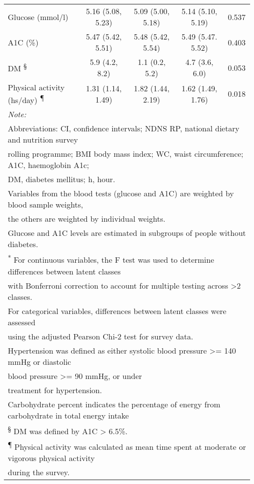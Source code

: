 \begin{table}
\begin{tabular}[t]{lcccc}
		Glucose (mmol/l) & 5.16 (5.08, 5.23) & 5.09 (5.00, 5.18) & 5.14 (5.10, 5.19) & 0.537\\
		A1C (\%) & 5.47 (5.42, 5.51) & 5.48 (5.42, 5.54) & 5.49 (5.47. 5.52) & 0.403\\
		DM \textsuperscript{\S} & 5.9 (4.2, 8.2) & 1.1 (0.2, 5.2) & 4.7 (3.6, 6.0) & 0.053\\
        Physical activity (hs/day) \textsuperscript{\P}& 1.31 (1.14, 1.49) & 1.82 (1.44, 2.19) & 1.62 (1.49, 1.76) & 0.018\\
		\bottomrule
		\multicolumn{5}{l}{\textit{Note: }}\\
		\multicolumn{5}{l}{Abbreviations: CI, confidence intervals; NDNS RP, national dietary and nutrition survey}\\
		\multicolumn{5}{l}{rolling programme; BMI body mass index; WC, waist circumference; A1C, haemoglobin A1c;}\\
		\multicolumn{5}{l}{DM, diabetes mellitus; h, hour.}\\
		\multicolumn{5}{l}{Variables from the blood tests (glucose and A1C) are weighted by blood sample weights,}\\
		\multicolumn{5}{l}{the others are weighted by individual weights.}\\
		\multicolumn{5}{l}{Glucose and A1C levels are estimated in subgroups of people without diabetes.}\\
		\multicolumn{5}{l}{\textsuperscript{*} For continuous variables, the F test was used to determine differences between latent classes}\\   
		\multicolumn{5}{l}{with Bonferroni correction to account for multiple testing across >2 classes.}\\
		\multicolumn{5}{l}{For categorical variables, differences between latent classes were assessed}\\
		\multicolumn{5}{l}{using the adjusted Pearson Chi-2 test for survey data.}\\
		\multicolumn{5}{l}{\textsuperscript{\dag} Hypertension was defined as either systolic blood pressure >= 140 mmHg or diastolic}\\ 
		\multicolumn{5}{l}{blood pressure >= 90 mmHg, or under}\\
		\multicolumn{5}{l}{treatment for hypertension.}\\
		\multicolumn{5}{l}{\textsuperscript{\ddag} Carbohydrate percent indicates the percentage of energy from carbohydrate in total energy intake}\\
		\multicolumn{5}{l}{\textsuperscript{\S} DM was defined by A1C > 6.5\%.}\\
		\multicolumn{5}{l}{\textsuperscript{\P} Physical activity was calculated as mean time spent at moderate or vigorous physical activity}\\ 
		\multicolumn{5}{l}{during the survey.}\\
	\end{tabular}
\end{table}

